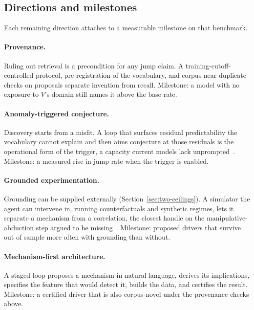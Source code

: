 \documentclass[11pt]{article}
\begin{document}
\subsection{Directions and milestones}
\label{sec:milestones}

Each remaining direction attaches to a measurable milestone on that benchmark.

\paragraph{Provenance.} Ruling out retrieval is a precondition for any jump claim. A
training-cutoff-controlled protocol, pre-registration of the vocabulary, and corpus near-duplicate
checks on proposals separate invention from recall. Milestone: a model with no exposure to $V$'s domain
still names it above the base rate.

\paragraph{Anomaly-triggered conjecture.} Discovery starts from a misfit. A loop that surfaces residual
predictability the vocabulary cannot explain and then aims conjecture at those residuals is the
operational form of the trigger, a capacity current models lack unprompted~\cite{dingli}. Milestone: a
measured rise in jump rate when the trigger is enabled.

\paragraph{Grounded experimentation.} Grounding can be supplied externally
(Section~\ref{sec:two-ceilings}). A simulator the agent can intervene in, running counterfactuals and
synthetic regimes, lets it separate a mechanism from a correlation, the closest handle on the
manipulative-abduction step argued to be missing~\cite{zahavy}. Milestone: proposed drivers that
survive out of sample more often with grounding than without.

\paragraph{Mechanism-first architecture.} A staged loop proposes a mechanism in natural language,
derives its implications, specifies the feature that would detect it, builds the data, and certifies the
result. Milestone: a certified driver that is also corpus-novel under the provenance checks above.
\end{document}
